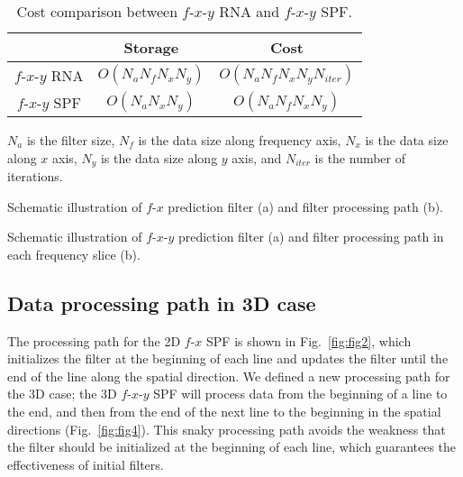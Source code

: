 \begin{table}[!t]
    \caption{
        Cost comparison between $f$-$x$-$y$ RNA and $f$-$x$-$y$ SPF. }
    \label{tbl:cost1}
    \centering
    \begin{threeparttable}
        \begin{tabular}{|c|c|c|}
            \hline
                            & Storage                             & Cost \\
            \hline
            $f$-$x$-$y$ RNA & $ O(N_{a}N_{f}N_{x}N_{y}) $
                            & $ O(N_{a}N_{f}N_{x}N_{y}N_{iter}) $        \\
            \hline
            $f$-$x$-$y$ SPF & $ O(N_{a}N_{x}N_{y}) $
                            & $ O(N_{a}N_{f}N_{x}N_{y}) $                \\
            \hline
        \end{tabular}

        \begin{tablenotes}
            $N_a$ is the filter size, $N_f$ is the data size along frequency
            axis, $N_x$ is the data size along $x$ axis, $N_y$ is the data
            size along $y$ axis, and $N_{iter}$ is the number of iterations.
        \end{tablenotes}
    \end{threeparttable}
\end{table}

 {Schematic
  illustration of $f$-$x$ prediction filter (a) and filter processing
  path (b).}

 {Schematic
  illustration of $f$-$x$-$y$ prediction filter (a) and filter
  processing path in each frequency slice (b).}

\subsection{Data processing path in 3D case}

The processing path for the 2D $f$-$x$ SPF is shown in
Fig.~\ref{fig:fig2}, which initializes the filter at the beginning of
each line and updates the filter until the end of the line along the
spatial direction. We defined a new processing path for the 3D case;
the 3D $f$-$x$-$y$ SPF will process data from the beginning of a line
to the end, and then from the end of the next line to the beginning in
the spatial directions (Fig.~\ref{fig:fig4}).  This snaky processing
path avoids the weakness that the filter should be initialized at the
beginning of each line, which guarantees the effectiveness of initial
filters.

